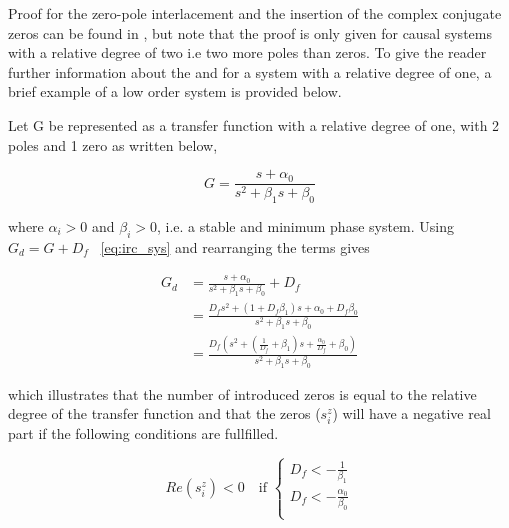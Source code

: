 Proof for the zero-pole interlacement and the insertion of the complex conjugate zeros can be found in \citep{Aphale:2007}, but note that the proof is only given for causal systems with a relative degree of two i.e two more poles than zeros. To give the reader further information about the \abbrIRC and for a system with a relative degree of one, a brief example of a low order system is provided below.

Let G be represented as a transfer function with a relative degree of one, with 2 poles and 1 zero as written below,

\begin{equation}
  \label{eq:irc_sys}
  G = \frac{s + \alpha_0}{s^2 + \beta_1s + \beta_0}
\end{equation}

where  $\alpha_i > 0$ and  $\beta_i > 0$, i.e. a stable and minimum phase system.  Using $G_d = G + D_f$  ~\eqref{eq:irc_sys} and rearranging the terms gives

\begin{equation}
  \label{eq:irc_sys_d}
  \begin{split}
  G_d & = \frac{s + \alpha_0}{s^2 + \beta_1s + \beta_0} + D_f \\
      & = \frac{D_fs^2 + (1 + D_f\beta_1)s + \alpha_0 + D_f\beta_0}{s^2 + \beta_1s + \beta_0} \\
      & = \frac{D_f(s^2 + (\frac{1}{D_f} + \beta_1)s + \frac{\alpha_0}{D_f} + \beta_0)}{s^2 + \beta_1s + \beta_0}
  \end{split}
\end{equation}

which illustrates that the number of introduced zeros is equal to the relative degree of the transfer function and that the zeros ($s^z_i$) will have a negative real part if the following conditions are fullfilled.

\begin{equation}
  \label{eq:irc_cond}
  Re(s^z_i) < 0 \quad \text{if }
  \begin{cases}
    D_f < -\frac{1}{\beta_1}\\
    D_f < -\frac{\alpha_0}{\beta_0}\\
  \end{cases}
\end{equation}





